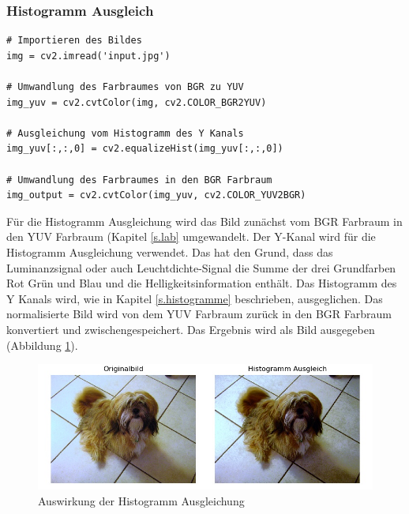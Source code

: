 \documentclass[a4paper,12pt,oneside]{article}
\begin{document}
\subsubsection{Histogramm Ausgleich}
\begin{lstlisting}
# Importieren des Bildes
img = cv2.imread('input.jpg')

# Umwandlung des Farbraumes von BGR zu YUV
img_yuv = cv2.cvtColor(img, cv2.COLOR_BGR2YUV)

# Ausgleichung vom Histogramm des Y Kanals
img_yuv[:,:,0] = cv2.equalizeHist(img_yuv[:,:,0])

# Umwandlung des Farbraumes in den BGR Farbraum
img_output = cv2.cvtColor(img_yuv, cv2.COLOR_YUV2BGR)
\end{lstlisting}
Für die Histogramm Ausgleichung \cite{histogram2012equalisation} wird das Bild zunächst vom BGR Farbraum in den YUV Farbraum (Kapitel \ref{s.lab} umgewandelt. Der Y-Kanal wird für die Histogramm Ausgleichung verwendet. Das hat den Grund, dass das Luminanzsignal oder auch Leuchtdichte-Signal die Summe der drei Grundfarben Rot Grün und Blau und die Helligkeitsinformation enthält. Das Histogramm des Y Kanals wird, wie in Kapitel \ref{s.histogramme} beschrieben, ausgeglichen. Das normalisierte Bild wird von dem YUV Farbraum zurück in den BGR Farbraum konvertiert und zwischengespeichert. Das Ergebnis wird als Bild ausgegeben (Abbildung \ref{img:histogrameq}).
\begin{figure}
	[h]
	\centering
	\includegraphics[scale=0.7]{Sources/histeq.jpg}
	\caption{Auswirkung der Histogramm Ausgleichung}
	\label{img:histogrameq}
\end{figure}	
\end{document}
